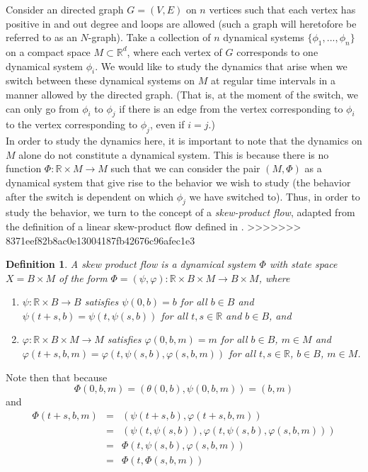 \documentclass[11pt]{article}
\newtheorem{defn}[thm]{Definition}
\begin{document}
\indent Consider an directed graph $G=(V,E)$ on $n$ vertices such that each vertex has positive in and out degree and loops are allowed (such a graph will heretofore be referred to as an $N$-graph).  Take a collection of $n$ dynamical systems $\{\phi_1,...,\phi_n\}$ on a compact space $M \subset \mathbb{R}^d$, where each vertex of $G$ corresponds to one dynamical system $\phi_i$.  We would like to study the dynamics that arise when we switch between these dynamical systems on $M$ at regular time intervals in a manner allowed by the directed graph. (That is, at the moment of the switch, we can only go from $\phi_i$ to $\phi_j$ if there is an edge from the vertex corresponding to $\phi_i$ to the vertex corresponding to $\phi_j$, even if $i=j$.) \\
\indent In order to study the dynamics here, it is important to note that the dynamics on $M$ alone do not constitute a dynamical system.  This is because there is no function $\Phi:\mathbb{R}\times M\rightarrow M$ such that we can consider the pair $(M,\Phi)$ as a dynamical system that give rise to the behavior we wish to study (the behavior after the switch is dependent on which $\phi_j$ we have switched to).  Thus, in order to study the behavior, we turn to the concept of a \emph{skew-product flow}, adapted from the definition of a linear skew-product flow defined in \cite{skewproduct}.
>>>>>>> 8371eef82b8ac0e13004187fb42676c96afec1e3
\begin{defn}\label{skewproduct}
A skew product flow is a dynamical system $\Phi$ with state space $X=B\times M$ of the form $\Phi=(\psi,\varphi):\mathbb{R}\times B\times M\rightarrow B\times M$, where 
\begin{enumerate}
\item $\psi:\mathbb{R}\times B\rightarrow B$ satisfies $\psi(0,b)=b$ for all $b\in B$ and $\psi(t+s,b)=\psi(t,\psi(s,b))$ for all $t,s\in\mathbb{R}$ and $b\in B$, and 
\item$\varphi:\mathbb{R}\times B\times M\rightarrow M$ satisfies $\varphi(0,b,m)=m$ for all $b\in B$, $m\in M$ and $\varphi(t+s,b,m)=\varphi(t,\psi(s,b),\varphi(s,b,m))$ for all $t,s\in\mathbb{R}$, $b\in B$, $m\in M$. 
\end{enumerate}
\end{defn} 
\noindent Note then that because $$\Phi(0,b,m)=(\theta(0,b), \psi(0,b,m))=(b,m)$$ and 
\begin{eqnarray*}
\Phi(t+s,b,m)&=&(\psi(t+s,b),\varphi(t+s,b,m))\\
&=&(\psi(t,\psi(s,b)),\varphi(t,\psi(s,b),\varphi(s,b,m)))\\
&=&\Phi(t,\psi(s,b),\varphi(s,b,m))\\
&=&\Phi(t,\Phi(s,b,m))
\end{eqnarray*}
\end{document}

